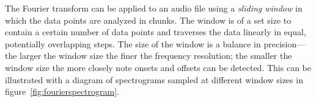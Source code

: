 The Fourier transform can be applied to an audio file using a \textit{sliding
window} in which the data points are analyzed in chunks. The window is of
a set size to contain a certain number of data points and traverses the data
linearly in equal, potentially overlapping steps. The size of the window
is a balance in precision---the larger the window size the finer the frequency
resolution; the smaller the window size the more closely note onsets and
offsets can be detected.
This can be illustrated with a diagram of spectrograms sampled at different
window sizes in figure~\ref{fig:fourierspectrogram}.